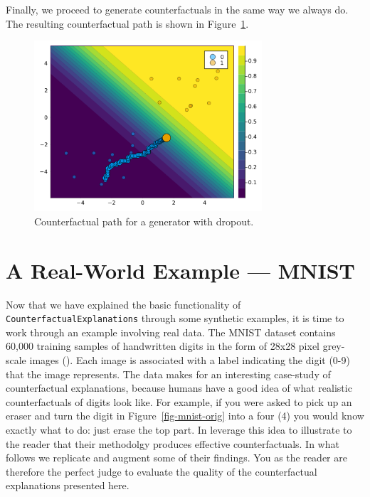 \documentclass[
  letterpaper,
  DIV=11,
  numbers=noendperiod]{scrartcl}
\begin{document}
Finally, we proceed to generate counterfactuals in the same way we
always do. The resulting counterfactual path is shown in
Figure~\ref{fig-dropout}.

\begin{figure}

{\centering \includegraphics[width=3.33333in,height=2.5in]{www/dropout.png}

}

\caption{\label{fig-dropout}Counterfactual path for a generator with
dropout.}

\end{figure}

\hypertarget{sec-emp}{%
\section{A Real-World Example --- MNIST}\label{sec-emp}}

Now that we have explained the basic functionality of
\texttt{CounterfactualExplanations} through some synthetic examples, it
is time to work through an example involving real data. The MNIST
dataset contains 60,000 training samples of handwritten digits in the
form of 28x28 pixel grey-scale images (\cite{lecun1998mnist}). Each
image is associated with a label indicating the digit (0-9) that the
image represents. The data makes for an interesting case-study of
counterfactual explanations, because humans have a good idea of what
realistic counterfactuals of digits look like. For example, if you were
asked to pick up an eraser and turn the digit in
Figure~\ref{fig-mnist-orig} into a four (4) you would know exactly what
to do: just erase the top part. In \cite{schut2021generating} leverage
this idea to illustrate to the reader that their methodolgy produces
effective counterfactuals. In what follows we replicate and augment some
of their findings. You as the reader are therefore the perfect judge to
evaluate the quality of the counterfactual explanations presented here.
\end{document}
